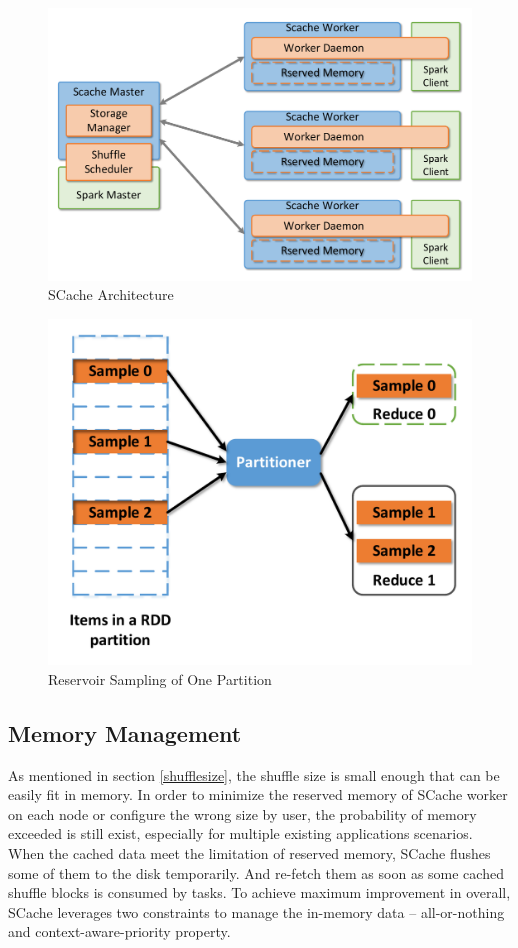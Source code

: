 \begin{figure}
	\centering
	\includegraphics[width=\linewidth]{fig/arch}
	\caption{SCache Architecture}
	\label{fig:arch}
\end{figure}
\begin{figure}
	\centering
	\includegraphics[width=\linewidth]{fig/sample}
	\caption{Reservoir Sampling of One Partition}
	\label{fig:sample}
\end{figure}

\subsection{Memory Management}
As mentioned in section \ref{shufflesize}, the shuffle size is small enough that can be easily fit in memory. In order to minimize the reserved memory of SCache worker on each node or configure the wrong size by user, the probability of memory exceeded is still exist, especially for multiple existing applications scenarios. When the cached data meet the limitation of reserved memory, SCache flushes some of them to the disk temporarily. And re-fetch them as soon as some cached shuffle blocks is consumed by tasks. To achieve maximum improvement in overall, SCache leverages two constraints to manage the in-memory data -- all-or-nothing and  context-aware-priority property.


